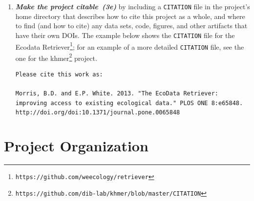 \documentclass[10pt,letterpaper]{article}
\newcommand{\withurl}[2]{{#1}\footnote{{\texttt{#2}}}}
\newcommand{\practicesection}[2]{\section{#1}\label{#2}}
\newcommand{\practice}[2]{\textbf{\emph{{#2}~({#1})}}}
\begin{document}
\begin{enumerate}
  We recommend Creative Commons licenses for data and text, either
  \withurl{CC-0}{https://creativecommons.org/about/cc0/} (the ``No
  Rights Reserved'' license) or
  \withurl{CC-BY}{https://creativecommons.org/licenses/by/4.0/} (the
  ``Attribution'' license, which permits sharing and reuse but
  requires people to give appropriate credit to the creators).  For
  software, we recommend a permissive open source license such as the
  MIT, BSD, or Apache license \cite{laurent2004}.

  \begin{quote}
    \noindent \textbf{What Not To Do}
    \\
    We recommend \emph{against} the ``no commercial use'' variations
    of the Creative Commons licenses because they may impede some
    forms of re-use.  For example, if a researcher in a developing
    country is being paid by her government to compile a public health
    report, she will be unable to include your data if the license
    says ``non-commercial''. We recommend permissive software licenses
    rather than the GNU General Public License (GPL) because it is
    easier to integrate permissively-licensed software into other
    projects, see chapter three in \cite{laurent2004}.
  \end{quote}

\item

  \practice{3e}{Make the project citable} by including a
  \texttt{CITATION} file in the project's home directory that
  describes how to cite this project as a whole, and where to find
  (and how to cite) any data sets, code, figures, and other artifacts
  that have their own DOIs.  The example below shows the
  \texttt{CITATION} file for the \withurl{Ecodata
  Retriever}{https://github.com/weecology/retriever}; for an example
  of a more detailed \texttt{CITATION} file, see the one for the
  \withurl{khmer}{https://github.com/dib-lab/khmer/blob/master/CITATION}
  project.

{\small
\begin{verbatim}
Please cite this work as:

Morris, B.D. and E.P. White. 2013. "The EcoData Retriever:
improving access to existing ecological data." PLOS ONE 8:e65848.
http://doi.org/doi:10.1371/journal.pone.0065848
\end{verbatim}
}

\end{enumerate}

\practicesection{Project Organization}{sec:project}
\end{document}
